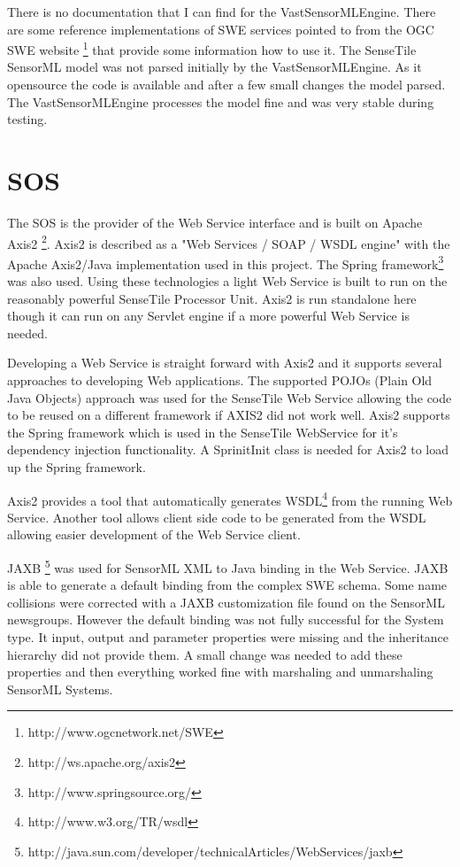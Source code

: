 \documentclass[]{final_report}
\begin{document}
There is no documentation that I can find for the VastSensorMLEngine. There are some reference implementations of SWE services pointed to from the OGC SWE website \footnote{http://www.ogcnetwork.net/SWE} that provide some information how to use it. The SenseTile SensorML model was not parsed initially by the VastSensorMLEngine. As it opensource the code is available and after a few small changes the model parsed. The VastSensorMLEngine processes the model fine and was very stable during testing. 


\section{SOS}
The SOS is the provider of the Web Service interface and is built on Apache Axis2 \footnote{http://ws.apache.org/axis2}. 
Axis2 is described as a "Web Services / SOAP / WSDL engine"  with the Apache Axis2/Java implementation used in this project. The Spring framework\footnote{http://www.springsource.org/} was also used. Using these technologies a light Web Service is built to run on the reasonably powerful SenseTile Processor Unit. Axis2 is run standalone here though it can run on any Servlet engine if a more powerful Web Service is needed.

Developing a Web Service is straight forward with Axis2 and it supports several approaches to developing Web applications. The supported POJOs (Plain Old Java Objects) approach was used for the SenseTile Web Service allowing the code to be reused on a different framework if AXIS2 did not work well. Axis2 supports the Spring framework which is used in the SenseTile WebService for it's dependency injection functionality. A SprinitInit class is needed for Axis2 to load up the Spring framework.

Axis2 provides a tool that automatically generates WSDL\footnote{http://www.w3.org/TR/wsdl} from the running Web Service. Another tool allows client side code to be generated from the WSDL allowing easier development of the Web Service client.

JAXB \footnote{http://java.sun.com/developer/technicalArticles/WebServices/jaxb} was used for SensorML XML to Java binding in the Web Service. JAXB is able to generate a default binding from the complex SWE schema. Some name collisions were corrected with a JAXB customization file found on the SensorML newsgroups. However the default binding was not fully successful for the System type. It input, output and parameter properties were missing and the inheritance hierarchy did not provide them. A small change was needed to add these properties and then everything worked fine with marshaling and unmarshaling SensorML Systems. 
\end{document}
